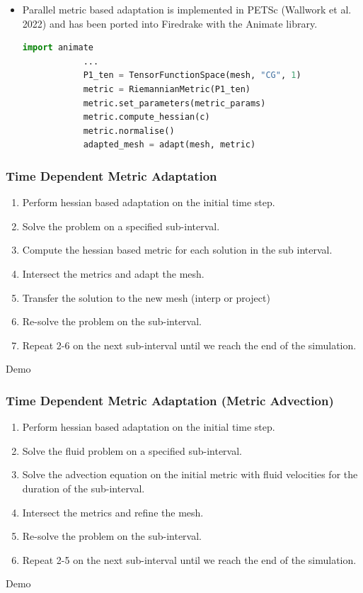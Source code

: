 \documentclass{beamer}
\begin{document}
  \begin{frame}[fragile]
	\begin{itemize}
		\item Parallel metric based adaptation is implemented in PETSc (Wallwork et al. 2022) and has been ported into Firedrake with the Animate library. 
		\vfill
		\begin{lstlisting}[language=Python, basicstyle=\ttfamily\scriptsize]
			import animate
			... 
			P1_ten = TensorFunctionSpace(mesh, "CG", 1)
			metric = RiemannianMetric(P1_ten)
			metric.set_parameters(metric_params)
			metric.compute_hessian(c)
			metric.normalise()
			adapted_mesh = adapt(mesh, metric)
		\end{lstlisting}
	\end{itemize}	
  \end{frame}

  \begin{frame}
	\frametitle{Time Dependent Metric Adaptation}
	\begin{enumerate}
		\item Perform hessian based adaptation on the initial time step.
		\item Solve the problem on a specified sub-interval.
		\item Compute the hessian based metric for each solution in the sub interval. 
		\item Intersect the metrics and adapt the mesh.
		\item Transfer the solution to the new mesh (interp or project)
		\item Re-solve the problem on the sub-interval.
		\item Repeat 2-6 on the next sub-interval until we reach the end of the simulation. 
	\end{enumerate}
  \end{frame}
  \begin{frame}
	\vfill
	Demo
	\vfill
  \end{frame}

  \begin{frame}
	\frametitle{Time Dependent Metric Adaptation (Metric Advection)}
	\begin{enumerate}
		\item Perform hessian based adaptation on the initial time step.
		\item Solve the fluid problem on a specified sub-interval.
		\item Solve the advection equation on the initial metric with fluid velocities for the duration of the sub-interval. 
		\item Intersect the metrics and refine the mesh.
		\item Re-solve the problem on the sub-interval.
		\item Repeat 2-5 on the next sub-interval until we reach the end of the simulation. 
	\end{enumerate}
  \end{frame}
  \begin{frame}
	\vfill
	Demo
	\vfill
  \end{frame}
\end{document}
